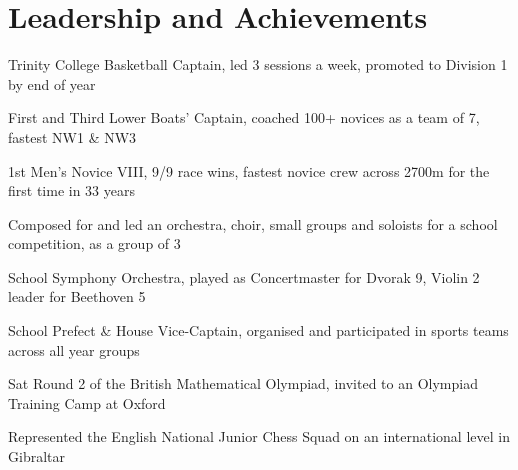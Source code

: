 \documentclass[letterpaper, 10pt]{article}
\begin{document}
\section*{Leadership and Achievements}
\vspace{-\baselineskip}
\begin{multicols}{2}
\begin{compact}
	\item Trinity College Basketball Captain, led 3 sessions a week, promoted to Division 1 by end of year%
	\item First and Third Lower Boats' Captain, coached 100+ novices as a team of 7, fastest NW1 \& NW3%
    \item 1st Men's Novice VIII, 9/9 race wins, fastest novice crew across 2700m for the first time in 33 years%
	\item Composed for and led an orchestra, choir, small groups and soloists for a school competition, as a group of 3%
    \vspace{-\baselineskip}
    \vfill\null\columnbreak
    \item School Symphony Orchestra, played as Concertmaster for Dvorak 9, Violin 2 leader for Beethoven 5%
    \item School Prefect \& House Vice-Captain, organised and participated in sports teams across all year groups%
	\item Sat Round 2 of the British Mathematical Olympiad, invited to an Olympiad Training Camp at Oxford%
	\item Represented the English National Junior Chess Squad on an international level in Gibraltar %
	\vspace{-\baselineskip}
\end{compact}
\end{multicols}
\end{document}
